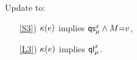 \begin{definition}[$\xCO$/$\xRASC$]
  \label{def:pomsets-ra}
  Update  to:
  \begin{enumerate}
  \item[\ref{S3})]
    $\kappa(e)$ implies $\mathsf{qs}_{\mu}^{x}\land M{=}v$,
  \item[\ref{L3})]
    $\kappa(e)$ implies $\mathsf{ql}_{\mu}^{x}$.
  \end{enumerate}
\end{definition}








